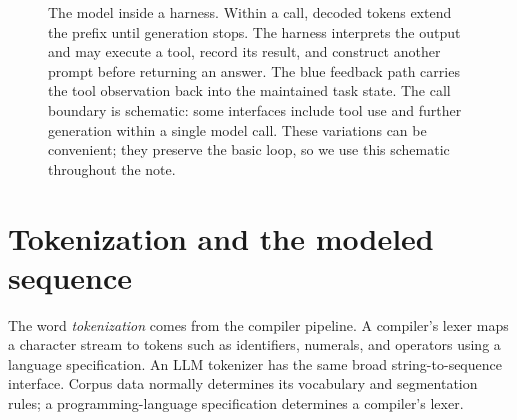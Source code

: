 \documentclass[11pt,twoside]{article}
\theoremstyle{plain}
\theoremstyle{definition}
\theoremstyle{remark}
\begin{document}
\begin{figure}[!ht]
\caption{The model inside a harness. Within a call, decoded tokens extend
the prefix until generation stops. The harness interprets the output and
may execute a tool, record its result, and construct another prompt before
returning an answer. The blue feedback path carries the tool observation
back into the maintained task state. The call boundary is schematic: some
interfaces include tool use and further generation within a single model
call. These variations can be convenient; they preserve the basic loop,
so we use this schematic throughout the note.}
\label{fig:harness-loop}
\end{figure}

\section{Tokenization and the modeled sequence}

The word \emph{tokenization} comes from the compiler pipeline. A compiler's
lexer maps a character stream to tokens such as identifiers, numerals, and
operators using a language specification. An LLM tokenizer has the same broad
string-to-sequence interface. Corpus data normally determines its vocabulary
and segmentation rules; a programming-language specification determines a
compiler's lexer.
\end{document}
